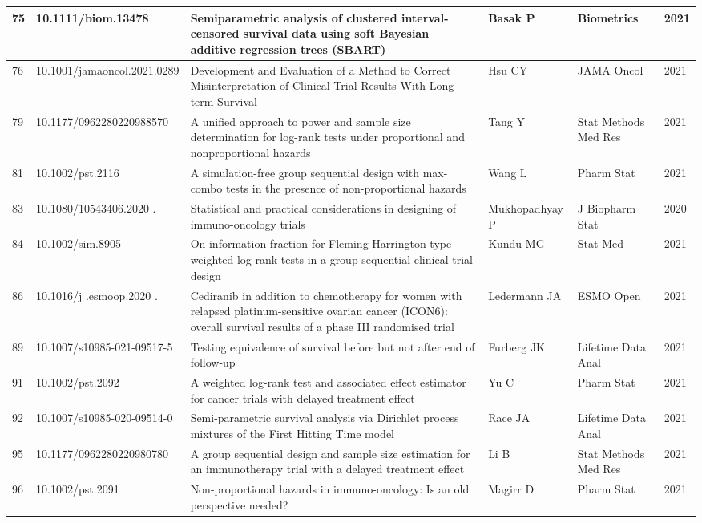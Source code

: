 \begin{landscape}
\begin{longtable}{|p{0.3in}|p{1.8in}|p{2.4in}|p{0.68in}|p{0.89in}|p{0.3in}|}
75 & 10.1111/biom.13478     & Semiparametric analysis of clustered interval-censored survival data using soft Bayesian additive regression trees (SBART) & Basak P & Biometrics & 2021 \\ \hline 
76 & 10.1001/jamaoncol.2021.0289     & Development and Evaluation of a Method to Correct Misinterpretation of Clinical Trial Results With Long-term Survival & Hsu CY & JAMA Oncol & 2021 \\ \hline 
79 & 10.1177/0962280220988570        & A unified approach to power and sample size determination for log-rank tests under proportional and nonproportional hazards & Tang Y & Stat Methods Med Res & 2021 \\ \hline 
81 & 10.1002/pst.2116     & A simulation-free group sequential design with max-combo tests in the presence of non-proportional hazards & Wang L & Pharm Stat & 2021 \\ \hline 
83 & 10.1080/10543406.2020       .\-1815035 & Statistical and practical considerations in designing of immuno-oncology trials & Mukho\-padhyay P & J Biopharm Stat & 2020 \\ \hline 
84 & 10.1002/sim.8905        & On information fraction for Fleming-Harrington type weighted log-rank tests in a group-sequential clinical trial design & Kundu MG & Stat Med & 2021 \\ \hline 
86 & 10.1016/j  .esmoop.2020   .\-100043 & Cediranib in addition to chemotherapy for women with relapsed platinum-sensitive ovarian cancer (ICON6): overall survival results of a phase III randomised trial & Ledermann JA & ESMO Open & 2021 \\ \hline 
89 & 10.1007/s10985-021-09517-5       & Testing equivalence of survival before but not after end of follow-up & Furberg JK & Lifetime Data Anal & 2021 \\ \hline 
91 & 10.1002/pst.2092    & A weighted log-rank test and associated effect estimator for cancer trials with delayed treatment effect & Yu C & Pharm Stat & 2021 \\ \hline 
92 & 10.1007/s10985-020-09514-0       & Semi-parametric survival analysis via Dirichlet process mixtures of the First Hitting Time model & Race JA & Lifetime Data Anal & 2021 \\ \hline 
95 & 10.1177/0962280220980780       & A group sequential design and sample size estimation for an immunotherapy trial with a delayed treatment effect & Li B & Stat Methods Med Res & 2021 \\ \hline 
96 & 10.1002/pst.2091   & Non-proportional hazards in immuno-oncology: Is an old perspective needed? & Magirr D & Pharm Stat & 2021 \\ \hline 

\end{longtable}
\end{landscape}
